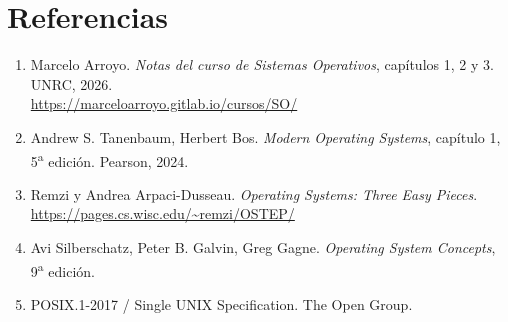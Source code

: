 \documentclass[11pt,a4paper]{article}
\begin{document}
\section*{Referencias}

\begin{enumerate}[leftmargin=*]
    \item Marcelo Arroyo. \emph{Notas del curso de Sistemas
        Operativos}, capítulos 1, 2 y 3. UNRC, 2026.\\
        \url{https://marceloarroyo.gitlab.io/cursos/SO/}
    \item Andrew S. Tanenbaum, Herbert Bos. \emph{Modern Operating
        Systems}, capítulo 1, 5\textsuperscript{a} edición. Pearson,
        2024.
    \item Remzi y Andrea Arpaci-Dusseau. \emph{Operating Systems: Three
        Easy Pieces}. \url{https://pages.cs.wisc.edu/~remzi/OSTEP/}
    \item Avi Silberschatz, Peter B. Galvin, Greg Gagne. \emph{Operating
        System Concepts}, 9\textsuperscript{a} edición.
    \item POSIX.1-2017 / Single UNIX Specification. The Open Group.
\end{enumerate}
\end{document}
